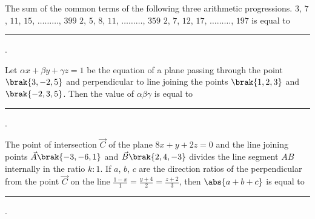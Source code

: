 \hfill{}

\item The sum of the common terms of the following three arithmetic progressions.\newline
$3$, $7$, $11$, $15$, $\dots\dots\dots$, $399$\newline
$2$, $5$, $8$, $11$, $\dots\dots\dots$, $359$\newline
$2$, $7$, $12$, $17$, $\dots\dots\dots$, $197$ is equal to \rule{1cm}{0.15mm}. 

\hfill{}

\item Let $\alpha x+\beta y+\gamma z=1$ be the equation of a plane passing through the point $\brak{3,-2,5}$ and perpendicular to line joining the points $\brak{1,2,3}$ and $\brak{-2,3,5}$. Then the value of $\alpha\beta\gamma$ is equal to \rule{1cm}{0.15mm}.

\hfill{}

\item The point of intersection $\vec{C}$ of the plane $8x+y+2z=0$ and the line joining points $\vec{A}\brak{-3,-6,1}$ and $\vec{B}\brak{2,4,-3}$ divides the line segment $AB$ internally in the ratio $k:1$. If $a$, $b$, $c$  are the direction ratios of the perpendicular from the point $\vec{C}$ on the line $\frac{1-x}{1}=\frac{y+4}{2}=\frac{z+2}{3}$, then $\abs{a+b+c}$ is equal to \rule{1cm}{0.15mm}.

\hfill{}

